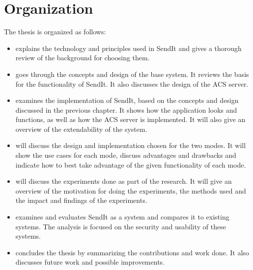 \section{Organization}
%
The thesis is organized as follows:\\
% 
\begin{itemize}
	\item {} explains the technology and principles used in SendIt and gives a thorough review of the background for choosing them.\\
	\item {} goes through the concepts and design of the base system. It reviews the basis for the functionality of SendIt. It also discusses the design of the ACS server.
	\item {} examines the implementation of SendIt, based on the concepts and design discussed in the previous chapter. It shows how the application looks and functions, as well as how the ACS server is implemented. It will also give an overview of the extendability of the system.\\
	\item {} will discuss the design and implementation chosen for the two modes. It will show the use cases for each mode, discuss advantages and drawbacks and indicate how to best take advantage of the given functionality of each mode.\\
	\item {} will discuss the experiments done as part of the research. It will give an overview of the motivation for doing the experiments, the methods used and the impact and findings of the experiments.\\
	\item {} examines and evaluates SendIt as a system and compares it to existing systems. The analysis is focused on the security and usability of these systems.\\
	\item {} concludes the thesis by summarizing the contributions and work done. It also discusses future work and possible improvements.
\end{itemize}
